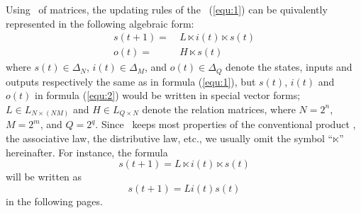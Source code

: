 Using \STP\ of matrices, the updating rules of the \BCN\ (\ref{equ:1}) can be quivalently represented in the following algebraic form:
\begin{equation}
\begin{split}
s(t+1)=&\ L\ltimes{i(t)}\ltimes{s(t)}\\
o(t)=&\ H\ltimes{s(t)}
\end{split}
\label{equ:2}
\end{equation}
where $s(t)\in\Delta_N$, $i(t)\in\Delta_M$, and  $o(t)\in\Delta_Q$ denote the states, inputs and outputs respectively the same as in formula (\ref{equ:1}), but $s(t)$, $i(t)$ and $o(t)$ in formula (\ref{equ:2}) would be written in special vector forms; $L\in L_{N\times\left(NM\right)}$ and $H\in L_{Q\times N}$ denote the relation matrices, where $N=2^n$, $M=2^m$, and $Q=2^q$. Since \STP\ keeps most properties of the conventional product \cite{Cheng2011Analysis}, the associative law, the distributive law, etc., we usually omit the symbol ``$\ltimes$'' hereinafter. For instance, the 
formula \[s(t+1)=L\ltimes{i(t)}\ltimes{s(t)}\] will be written as  \[s(t+1)=L{i(t)}{s(t)}\] in the following pages.

